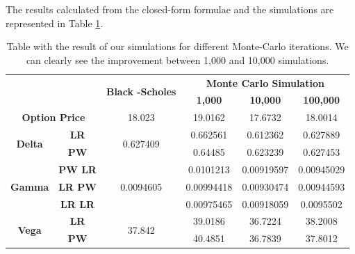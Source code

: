 \documentclass[11pt,a4paper,fleqn]{article}
\begin{document}
The results calculated from the closed-form formulae and the simulations are represented in Table \ref{tab:euroresults}.


\begin{table}[h!]
\centering
\begin{tabular}{|c|c|c|c|c|c|}
\hline
\multicolumn{2}{|c|}{\multirow{2}{*}{}}          & \multirow{2}{*}{\textbf{Black -Scholes}} & \multicolumn{3}{c|}{\textbf{Monte Carlo Simulation}} \\ \cline{4-6}
\multicolumn{2}{|c|}{}                           &                                          & \textbf{1,000}  & \textbf{10,000} & \textbf{100,000} \\ \hline
\multicolumn{2}{|c|}{\textbf{Option Price}}      & 18.023                                   & 19.0162         & 17.6732         & 18.0014          \\ \hline
\multirow{2}{*}{\textbf{Delta}} & \textbf{LR}    & \multirow{2}{*}{0.627409}                & 0.662561        & 0.612362        & 0.627889         \\ \cline{2-2} \cline{4-6}
                                & \textbf{PW}    &                                          & 0.64485         & 0.623239        & 0.627453         \\ \hline
\multirow{3}{*}{\textbf{Gamma}} & \textbf{PW LR} & \multirow{3}{*}{0.0094605}               & 0.0101213       & 0.00919597      & 0.00945029       \\ \cline{2-2} \cline{4-6}
                                & \textbf{LR PW} &                                          & 0.00994418      & 0.00930474      & 0.00944593       \\ \cline{2-2} \cline{4-6}
                                & \textbf{LR LR} &                                          & 0.00975465      & 0.00918059      & 0.0095502        \\ \hline
\multirow{2}{*}{\textbf{Vega}}  & \textbf{LR}    & \multirow{2}{*}{37.842}                  & 39.0186         & 36.7224         & 38.2008          \\ \cline{2-2} \cline{4-6}
                                & \textbf{PW}    &                                          & 40.4851         & 36.7839         & 37.8012          \\ \hline
\end{tabular}
\caption{\label{tab:euroresults}Table with the result of our simulations for different Monte-Carlo iterations. We can clearly see the improvement between 1,000 and 10,000 simulations.}
\end{table}
\end{document}
